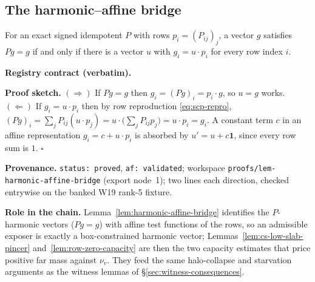\subsection{The harmonic--affine bridge}

\begin{lemma}\label{lem:harmonic-affine-bridge}
For an exact signed idempotent $P$ with rows $p_i=(P_{ij})_j$, a vector $g$ satisfies $Pg=g$ if and
only if there is a vector $u$ with $g_i=u\cdot p_i$ for every row index $i$.
\end{lemma}

\noindent\textbf{Registry contract (verbatim).}

\noindent\textbf{Proof sketch.} $(\Rightarrow)$ If $Pg=g$ then $g_i=(Pg)_i=p_i\cdot g$, so $u=g$ works.
$(\Leftarrow)$ If $g_i=u\cdot p_i$ then by row reproduction \eqref{eq:scp-repro},
$(Pg)_i=\sum_j P_{ij}(u\cdot p_j)=u\cdot\bigl(\sum_j P_{ij}p_j\bigr)=u\cdot p_i=g_i$. A constant term
$c$ in an affine representation $g_i=c+u\cdot p_i$ is absorbed by $u'=u+c\mathbf1$, since every row sum
is $1$. \hfill$\square$

\noindent\textbf{Provenance.} \texttt{status: proved}, \texttt{af: validated}; workspace
\texttt{proofs/lem-harmonic-affine-bridge} (export node~1); two lines each direction, checked
entrywise on the banked W19 rank-5 fixture.

\noindent\textbf{Role in the chain.} Lemma~\ref{lem:harmonic-affine-bridge} identifies the $P$-harmonic
vectors ($Pg=g$) with affine test functions of the rows, so an admissible exposer is exactly a
box-constrained harmonic vector; Lemmas~\ref{lem:cs-low-slab-pincer}
and~\ref{lem:row-zero-capacity} are then the two capacity estimates that price positive far mass against
$\nu_v$. They feed the same halo-collapse and starvation arguments as the witness lemmas of
\S\ref{sec:witness-consequences}.
